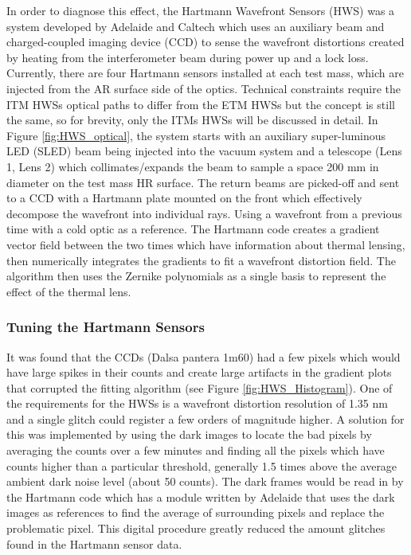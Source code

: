 	In order to diagnose this effect, the Hartmann Wavefront Sensors (HWS) \cite{Brooks_OffAxis} \cite{Veitch_HWS_ALIGO} was a system developed by Adelaide and Caltech \cite{Brooks_HWS_2007} \cite{Brooks_HWS_2009} which uses an auxiliary  beam and charged-coupled imaging device (CCD) to sense the wavefront distortions created by heating from the interferometer beam during power up and a lock loss.  Currently, there are four Hartmann sensors installed at each test mass, which are injected from the AR surface side of the optics. Technical constraints require the ITM HWSs optical paths to differ from the ETM HWSs but the concept is still the same, so for brevity, only the ITMs HWSs will be discussed in detail.  In Figure \ref{fig:HWS_optical}, the system starts with an auxiliary super-luminous LED (SLED) beam being injected into the vacuum system and a telescope (Lens 1, Lens 2) which collimates/expands the beam to sample a space 200 mm in diameter on the test mass HR surface.  The return beams are picked-off and sent to a CCD with a Hartmann plate mounted on the front which effectively decompose the wavefront into individual rays.  Using a wavefront from a previous time with a cold optic as a reference. The Hartmann code creates a gradient vector field between the two times which have information about thermal lensing, then numerically integrates the gradients to fit a wavefront distortion field.  The algorithm then uses the Zernike polynomials as a single basis to represent the effect of the thermal lens. \cite{Brooks_thesis}
	
	\subsubsection{Tuning the Hartmann Sensors}
	
	It was found that the CCDs (Dalsa pantera 1m60) had a few pixels which would have large spikes in their counts and create large artifacts in the gradient plots that corrupted the fitting algorithm (see Figure \ref{fig:HWS_Histogram}).  One of the requirements for the HWSs is a wavefront distortion resolution of 1.35 nm \cite{AWC_current} and a single glitch could register a few orders of magnitude higher.  A solution for this was implemented by using the dark images to locate the bad pixels by averaging the counts over a few minutes and finding all the pixels which have counts higher than a particular threshold, generally 1.5 times above the average ambient dark noise level (about 50 counts).  The dark frames would be read in by the Hartmann code which has a module written by Adelaide that uses the dark images as references to find the average of surrounding pixels and replace the problematic pixel.  This digital procedure greatly reduced the amount glitches found in the Hartmann sensor data.
	
